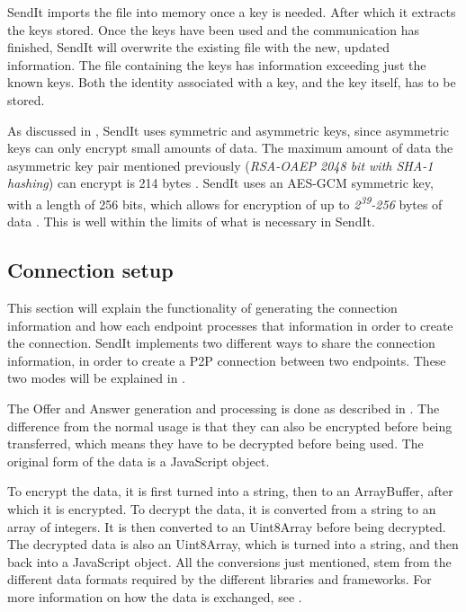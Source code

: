     SendIt imports the file into memory once a key is needed. After which it extracts the keys stored. Once the keys have been used and the communication has finished, SendIt will overwrite the existing file with the new, updated information. The file containing the keys has information exceeding just the known keys. Both the identity associated with a key, and the key itself, has to be stored.

    As discussed in , SendIt uses symmetric and asymmetric keys, since asymmetric keys can only encrypt small amounts of data. The maximum amount of data the asymmetric key pair mentioned previously (\emph{RSA-OAEP 2048 bit with SHA-1 hashing}) can encrypt is 214 bytes \cite{PKCSV2RSA2012}. SendIt uses an AES-GCM symmetric key, with a length of 256 bits, which allows for encryption of up to \emph{2\textsuperscript{39}-256} bytes of data \cite{ar_webcrypto}. This is well within the limits of what is necessary in SendIt. 

%
  \subsection{Connection setup}
  \label{sec:conn_set_imp}
    This section will explain the functionality of generating the connection information and how each endpoint processes that information in order to create the connection. SendIt implements two different ways to share the connection information, in order to create a P2P connection between two endpoints. These two modes will be explained in .

    The Offer and Answer generation and processing is done as described in . The difference from the normal usage is that they can also be encrypted before being transferred, which means they have to be decrypted before being used. The original form of the data is a JavaScript object.

    To encrypt the data, it is first turned into a string, then to an ArrayBuffer, after which it is encrypted. To decrypt the data, it is converted from a string to an array of integers. It is then converted to an Uint8Array before being decrypted. The decrypted data is also an Uint8Array, which is turned into a string, and then back into a JavaScript object. All the conversions just mentioned, stem from the different data formats required by the different libraries and frameworks. For more information on how the data is exchanged, see .

